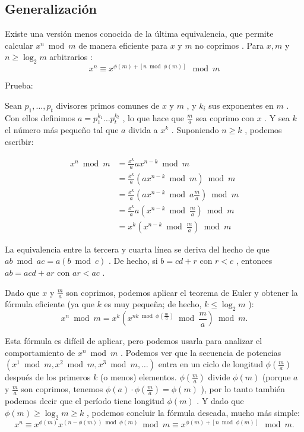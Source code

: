 \subsection{Generalización}

Existe una versión menos conocida de la última equivalencia, que permite calcular $x^n \bmod m$ de manera eficiente para $x$ y $m$ no coprimos . Para $x, m$ y $n \geq \log_2 m$ arbitrarios :
$$x^{n}\equiv x^{\phi(m)+[n \bmod \phi(m)]} \mod m$$

Prueba:

Sean $p_1, \dots, p_t$ divisores primos comunes de $x$ y $m$ , y $k_i$ sus exponentes en $m$ . Con ellos definimos $a = p_1^{k_1} \dots p_t^{k_t}$ , lo que hace que $\frac{m}{a}$ sea coprimo con $x$ . Y sea $k$ el número más pequeño tal que $a$ divida a $x^k$ . Suponiendo $n \ge k$ , podemos escribir:


\begin{align}x^n \bmod m &= \frac{x^k}{a}ax^{n-k}\bmod m \\
	&= \frac{x^k}{a}\left(ax^{n-k}\bmod m\right) \bmod m \\
	&= \frac{x^k}{a}\left(ax^{n-k}\bmod a \frac{m}{a}\right) \bmod m \\
	&=\frac{x^k}{a} a \left(x^{n-k} \bmod \frac{m}{a}\right)\bmod m \\
	&= x^k\left(x^{n-k} \bmod \frac{m}{a}\right)\bmod m
\end{align}

La equivalencia entre la tercera y cuarta línea se deriva del hecho de que $ab \bmod ac = a(b \bmod c)$ . De hecho, si $b = cd + r$ con $r < c$ , entonces $ab = acd + ar$ con $ar < ac$ .

Dado que $x$ y $\frac{m}{a}$ son coprimos, podemos aplicar el teorema de Euler y obtener la fórmula eficiente (ya que $k$ es muy pequeña; de hecho, $k \le \log_2 m$ ):
$$x^n \bmod m = x^k\left(x^{nk \bmod \phi(\frac{m}{a})} \bmod \frac{m}{a}\right)\bmod m .$$

Esta fórmula es difícil de aplicar, pero podemos usarla para analizar el comportamiento de $x^n \bmod m$ . Podemos ver que la secuencia de potencias $(x^1 \bmod m, x^2 \bmod m, x^3 \bmod m, \dots)$ entra en un ciclo de longitud $\phi\left(\frac{m }{a}\right)$ después de los primeros $k$ (o menos) elementos. $\phi\left(\frac{m}{a}\right)$ divide $\phi(m)$ (porque $a$ y $\frac{m}{a}$ son coprimos, tenemos $\phi( a) \cdot \phi\left(\frac{m}{a}\right) = \phi(m)$ ), por lo tanto también podemos decir que el período tiene longitud $\phi(m)$ . Y dado que $\phi(m) \ge \log_2 m \ge k$ , podemos concluir la fórmula deseada, mucho más simple:
$$ x^n \equiv x^{\phi(m)} x^{(n - \phi(m)) \bmod \phi(m)} \bmod m \equiv x^{\phi(m)+ [n \bmod \phi(m)]} \mod m.$$ 

